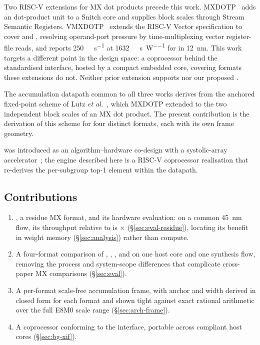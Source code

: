 Two RISC-V extensions for MX dot products precede this
work. MXDOTP~\cite{islamoglu2025mxdotp} adds an \fpeight{} dot-product unit to
a Snitch core and supplies block scales through Stream Semantic Registers.
VMXDOTP~\cite{wipfli2026vmxdotp} extends the RISC-V Vector specification to
cover \fpeight{} and \fpfour, resolving operand-port pressure by
time-multiplexing vector register-file reads, and reports
\SI{250}{\giga\flop\per\second} at \SI{1632}{\giga\flop\per\second\per\watt}
for \fpfour{} in \SI{12}{\nano\meter}. This work targets a different point in
the design space: a coprocessor behind the standardised \xif{} interface,
hosted by a compact embedded core, covering formats these extensions do not.
Neither prior extension supports \mtwo{} nor our proposed \fpfourres.

The accumulation datapath common to all three works derives from the anchored
fixed-point scheme of Lutz \emph{et al.}~\cite{lutz2024fp8dot}, which
MXDOTP extended to the two independent block scales of an MX dot product. The
present contribution is the derivation of this scheme for four distinct
formats, each with its own frame geometry.

\mtwo{} was introduced as an algorithm–hardware co-design with a systolic-array
accelerator~\cite{m2xfp2026}; the engine described here is a RISC-V coprocessor
realisation that re-derives the per-subgroup top-1 element within the datapath.

\subsection{Contributions}
\label{sec:intro-contrib}

\begin{enumerate}
  \item \fpfourres, a residue MX format, and its hardware evaluation: on a
        common \SI{45}{\nano\meter} flow, its throughput relative to \fpeight{}
        is $\times$ (\S\ref{sec:eval-residue}), locating its benefit
        in weight memory (\S\ref{sec:analysis}) rather than compute.
  \item A four-format comparison of \fpfour, \fpeight, \mtwo, and \fpfourres{}
        on one host core and one synthesis flow, removing the process and
        system-scope differences that complicate cross-paper MX comparisons
        (\S\ref{sec:eval}).
  \item A per-format scale-free accumulation frame, with anchor and width
        derived in closed form for each format and shown tight against exact
        rational arithmetic over the full E8M0 scale range
        (\S\ref{sec:arch-frame}).
  \item A coprocessor conforming to the \xif{} interface, portable across
        compliant host cores (\S\ref{sec:bg-xif}).
\end{enumerate}